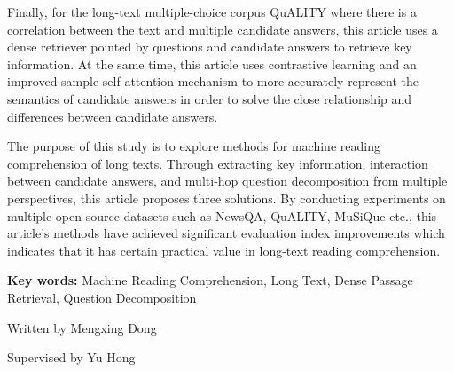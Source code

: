 \begin{eabstract}
	Finally, for the long-text multiple-choice corpus QuALITY where there is a correlation between the text and multiple candidate answers, this article uses a dense retriever pointed by questions and candidate answers to retrieve key information. At the same time, this article uses contrastive learning and an improved sample self-attention mechanism to more accurately represent the semantics of candidate answers in order to solve the close relationship and differences between candidate answers.
	
	The purpose of this study is to explore methods for machine reading comprehension of long texts. Through extracting key information, interaction between candidate answers, and multi-hop question decomposition from multiple perspectives, this article proposes three solutions. By conducting experiments on multiple open-source datasets such as NewsQA, QuALITY, MuSiQue etc., this article's methods have achieved significant evaluation index improvements which indicates that it has certain practical value in long-text reading comprehension.

	\vskip 21bp
	{\bf{} Key words: }
	Machine Reading Comprehension,
	Long Text,
	Dense Passage Retrieval,
	Question Decomposition
\end{eabstract}

\begin{flushright}
	Written by Mengxing Dong
	
	Supervised by Yu Hong
\end{flushright}

